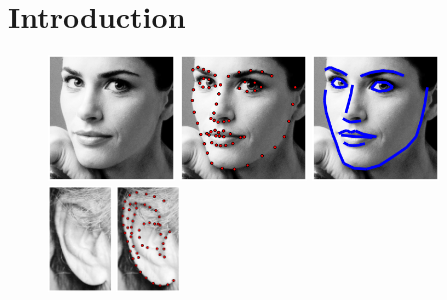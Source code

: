 \chapter{Introduction}
\minitoc

\begin{figure}[ht]
    \centering
    \includegraphics[width=0.3\textwidth]{resources/Annotation_Correction/Fig_Intro/intro_0_0}
    \hfill
    \includegraphics[width=0.3\textwidth]{resources/Annotation_Correction/Fig_Intro/intro_0_1}
    \hfill
    \includegraphics[width=0.3\textwidth]{resources/Annotation_Correction/Fig_Intro/intro_0_2}
    \\
    \includegraphics[width=0.15\textwidth]{resources/Annotation_Correction/Fig_Intro/intro_1_0}
    \hfill
    \includegraphics[width=0.15\textwidth]{resources/Annotation_Correction/Fig_Intro/intro_1_1}

\end{figure}
